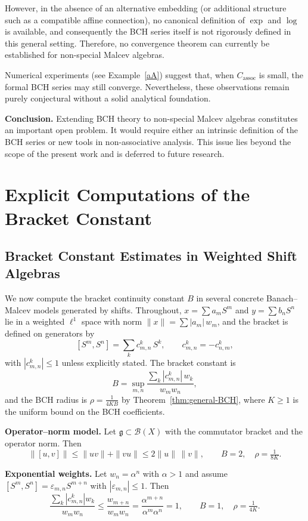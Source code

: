 \documentclass[11pt]{amsart}
\numberwithin{equation}{section}
\theoremstyle{remark}
\begin{document}
However, in the absence of an alternative embedding (or additional structure such as a compatible affine connection),  no canonical definition of $\exp$ and $\log$ is available, and consequently  the BCH series itself is not rigorously defined in this general setting. Therefore, no convergence theorem can currently be established for non-special Malcev algebras.

Numerical experiments (see Example~\ref{aA}) suggest that, when $C_{\mathrm{assoc}}$ is small, the formal BCH series may still converge. Nevertheless, these observations remain purely conjectural without a solid analytical foundation.

\medskip
\noindent
\textbf{Conclusion.} Extending BCH theory to non-special Malcev algebras constitutes an important open problem. It would require either an intrinsic definition of the BCH series or new tools in non-associative analysis. This issue lies beyond the scope of the present work and is deferred to future research.
\section{Explicit Computations of the Bracket Constant}\label{sec:explicit-B}

\subsection{Bracket Constant Estimates in Weighted Shift Algebras}

We now compute the bracket continuity constant $B$ in several concrete Banach--Malcev models generated by shifts.
Throughout, $x=\sum a_m S^m$ and $y=\sum b_n S^n$ lie in a weighted $\ell^1$ space with norm $\|x\|=\sum |a_m|\,w_m$, and the bracket is defined on generators by
\[
[S^m,S^n]=\sum_k c_{m,n}^k\, S^k,\qquad c_{m,n}^k=-c_{n,m}^k,
\]
with $|c_{m,n}^k|\le 1$ unless explicitly stated. The bracket constant is
\[
B=\sup_{m,n}\frac{\sum_k |c_{m,n}^k|\,w_k}{w_m w_n},
\]
and the BCH radius is $\rho=\frac{1}{4KB}$ by Theorem~\ref{thm:general-BCH}, where $K \geq 1$ is the uniform bound on the BCH coefficients.

\medskip
\noindent\textbf{Operator--norm model.}
Let $\mathfrak g\subset\mathcal B(X)$ with the commutator bracket and the operator norm. Then
\[
\|[u,v]\|\le \|uv\|+\|vu\|\le 2\|u\|\,\|v\|,\qquad
B=2,\quad \rho=\tfrac{1}{8K}.
\]

\smallskip
\noindent\textbf{Exponential weights.}
Let $w_n=\alpha^n$ with $\alpha>1$ and assume $[S^m,S^n]=\varepsilon_{m,n}S^{m+n}$ with $|\varepsilon_{m,n}|\le 1$. Then
\[
\frac{\sum_k |c_{m,n}^k|w_k}{w_mw_n}\le \frac{w_{m+n}}{w_mw_n}=\frac{\alpha^{m+n}}{\alpha^m\alpha^n}=1,
\qquad B=1,\quad \rho=\tfrac{1}{4K}.
\]
\end{document}
